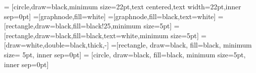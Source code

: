 \newcommand{\fS}{\mathsf{S}}
\newcommand{\fW}{\mathsf{W}}
\newcommand{\fB}{\mathsf{B}}
\newcommand{\fK}{\mathsf{K}}
\newcommand{\fH}{\mathsf{H}}
\newcommand{\fk}{\mathsf{k}}
\newcommand{\fh}{\mathsf{h}}
\newcommand{\fL}{\mathsf{L}}

\newcommand{\sA}{\boldsymbol{\mathsf{A}}}
\newcommand{\sB}{\boldsymbol{\mathsf{B}}}
\newcommand{\sC}{\boldsymbol{\mathsf{C}}}

\usepackage{colonequals}
\newcommand{\ce}{\colonequals}
\newcommand{\ec}{\equalscolon}

\usepackage{nicefrac}

\newcommand{\braket}[2]{\left\langle #1 , #2 \right\rangle}
\newcommand{\brakets}[3]{\left\langle #1 \, \middle| \, #2 \, \middle|\, #3 \right\rangle}

\usetikzlibrary{arrows,shapes,plotmarks}

\tikzset{>=stealth'} 
 = 
[circle,draw=black,minimum size=22pt,text centered,text
width=22pt,inner sep=0pt] 
   =[graphnode,fill=white]
   =[graphnode,fill=black,text=white]
   =[rectangle,draw=black,fill=black!25,minimum size=5pt]
 =[rectangle,draw=black,fill=black,text=white,minimum size=5pt]
  =[draw=white,double=black,thick,-]
 =[rectangle, draw=black, fill=black, minimum size=
5pt, inner sep=0pt]
 = [circle, draw=black, fill=black, minimum
size=5pt, inner sep=0pt]

\DeclareMathSymbol\leftarrowtriangle{}
\DeclareMathSymbol\rightarrowtriangle{}
\renewcommand{\gets}{\operatorname*{\leftarrowtriangle}}
\renewcommand{\to}{\operatorname*{\rightarrowtriangle}}


\newcommand{\PHcomment}[1]{%
	\refstepcounter{PHcomment}%
	{%
		\todo[inline,color={MPG!20},size=\small]{%
			\textbf{Comment [PH \thePHcomment]:}~#1}%
}}


